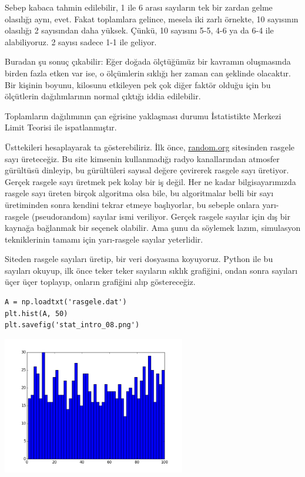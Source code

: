 \documentclass[12pt,fleqn]{article}\usepackage{../../common}
\begin{document}
Sebep kabaca tahmin edilebilir, 1 ile 6 arası sayıların tek bir zardan gelme
olasılığı aynı, evet. Fakat toplamlara gelince, mesela iki zarlı örnekte, 10
sayısının olasılığı 2 sayısından daha yüksek. Çünkü, 10 sayısını 5-5, 4-6 ya da
6-4 ile alabiliyoruz. 2 sayısı sadece 1-1 ile geliyor.

Buradan şu sonuç çıkabilir: Eğer doğada ölçtüğümüz bir kavramın oluşmasında
birden fazla etken var ise, o ölçümlerin sıklığı her zaman can şeklinde
olacaktır. Bir kişinin boyunu, kilosunu etkileyen pek çok diğer faktör
olduğu için bu ölçütlerin dağılımlarının normal çıktığı iddia edilebilir.

Toplamların dağılımının çan eğrisine yaklaşması durumu İstatistikte Merkezi
Limit Teorisi ile ispatlanmıştır. 

Üsttekileri hesaplayarak ta gösterebiliriz. İlk önce, \url{random.org}
sitesinden rasgele sayı üreteceğiz. Bu site kimsenin kullanmadığı radyo
kanallarından atmosfer gürültüsü dinleyip, bu gürültüleri sayısal değere
çevirerek rasgele sayı üretiyor. Gerçek rasgele sayı üretmek pek kolay bir
iş değil. Her ne kadar bilgisayarımızda rasgele sayı üreten birçok
algoritma olsa bile, bu algoritmalar belli bir sayı üretiminden sonra
kendini tekrar etmeye başlıyorlar, bu sebeple onlara yarı-rasgele
(pseudorandom) sayılar ismi veriliyor. Gerçek rasgele sayılar için dış bir
kaynağa bağlanmak bir seçenek olabilir. Ama şunu da söylemek lazım,
simulasyon tekniklerinin tamamı için yarı-rasgele sayılar yeterlidir.

Siteden rasgele sayıları üretip, bir veri dosyasına koyuyoruz. Python ile
bu sayıları okuyup, ilk önce teker teker sayıların sıklık grafiğini, ondan
sonra sayıları üçer üçer toplayıp, onların grafiğini alıp
göstereceğiz. 

\begin{verbatim}
A = np.loadtxt('rasgele.dat')
plt.hist(A, 50)
plt.savefig('stat_intro_08.png')
\end{verbatim}

\includegraphics[height=6cm]{stat_intro_08.png}
\end{document}
